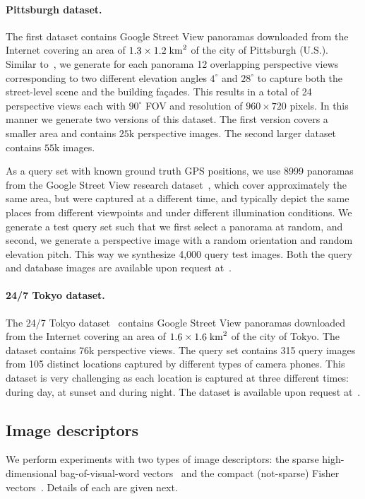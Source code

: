     \paragraph{Pittsburgh dataset.}
      The first dataset contains Google Street View panoramas downloaded from the Internet covering an area of $1.3 \times 1.2 \; {\rm km}^2$ of the city of Pittsburgh (U.S.). Similar to~\cite{Chen11}, we generate for each panorama 12 overlapping perspective views corresponding to two different elevation angles $4^\circ$ and $28^\circ$ to capture both the street-level scene and the building fa\c{c}ades. This results in a total of 24 perspective views each with $90^\circ$ FOV and resolution of $960 \times 720$ pixels. In this manner we generate two versions of this dataset. The first version covers a smaller area and contains $25$k perspective images.  The second larger dataset contains $55$k images.

      As a query set with known ground truth GPS positions, we use 8999 panoramas from the Google Street View research dataset~\cite{GoogleResearch}, which cover approximately the same area, but were captured at a different time, and typically depict the same places from different viewpoints and under different illumination conditions.          
      We generate a test query set such that we first select a panorama at random, and second, we generate a perspective image with a random orientation and random elevation pitch. This way we synthesize 4,000 query test images. Both the query and database images are available upon request at~\cite{GronatProjectPage}.


    \paragraph{24/7 Tokyo dataset.}
      The 24/7 Tokyo dataset~\cite{Torii2015} contains Google Street View panoramas downloaded from the Internet covering an area of $1.6 \times 1.6 \; {\rm km}^2$ of the city of Tokyo. The dataset contains 76k perspective views. The query set contains 315 query images from 105 distinct locations captured by different types of camera phones. This dataset is very challenging as each location is captured at three different times: during day, at sunset and during night. 
      The dataset is available upon request at~\cite{Torii15project}.


    \subsection{Image descriptors}
      We perform experiments with two types of image descriptors: the sparse high-dimensional bag-of-visual-word vectors~\cite{Sivic03} and the compact (not-sparse) Fisher vectors~\cite{Jegou12}. Details of each are given next.

